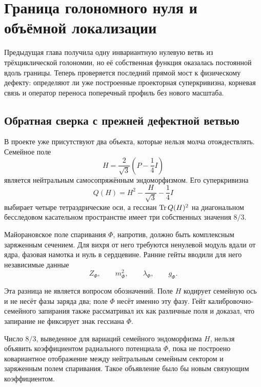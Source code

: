 \chapter{Граница голономного нуля и объёмной локализации}

Предыдущая глава получила одну инвариантную нулевую ветвь из
трёхциклической голономии, но её собственная функция оказалась постоянной
вдоль границы. Теперь проверяется последний прямой мост к физическому
дефекту: определяют ли уже построенные проекторная суперкривизна,
корневая связь и оператор переноса поперечный профиль без нового масштаба.

\section{Обратная сверка с прежней дефектной ветвью}

В проекте уже присутствуют два объекта, которые нельзя молча
отождествлять. Семейное поле
\begin{equation}
 H=\frac{2}{\sqrt3}\left(P-\frac14I\right)
\end{equation}
является нейтральным самосопряжённым эндоморфизмом. Его суперкривизна
\begin{equation}
 Q(H)=H^2-\frac{H}{\sqrt3}-\frac14I
 \label{eq:v5-localization-qh}
\end{equation}
выбирает четыре тетраэдрические оси, а гессиан
$\operatorname{Tr} Q(H)^2$ на диагональном бесследовом касательном пространстве имеет
три собственных значения $8/3$.

Майорановское поле спаривания $\Phi$, напротив, должно быть комплексным
заряженным сечением. Для вихря от него требуются ненулевой модуль вдали от
ядра, фазовая намотка и нуль в сердцевине. Ранние гейты вводили для него
независимые данные
\begin{equation}
 Z_\Phi,\qquad m_\Phi^2,\qquad\lambda_\Phi,\qquad g_\Phi.
 \label{eq:v5-localization-free-data}
\end{equation}

Эта разница не является вопросом обозначений. Поле $H$ кодирует семейную
ось и не несёт фазы заряда два; поле $\Phi$ несёт именно эту фазу.
Гейт калибровочно-семейного запирания также рассматривал их как различные
поля и доказал, что запирание не фиксирует знак гессиана $\Phi$.

\begin{nogocriterion}
Число $8/3$, выведенное для вариаций семейного эндоморфизма $H$, нельзя
объявить коэффициентом радиального потенциала $\Phi$, пока не построено
ковариантное отображение между нейтральным семейным сектором и заряженным
полем спаривания. Такое объявление было бы новым связующим коэффициентом.
\end{nogocriterion}

